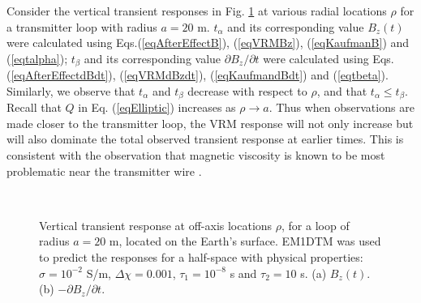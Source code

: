 \documentclass[onecolumn]{IEEEtran} %
\begin{document}
Consider the vertical transient responses in Fig. \ref{figEMandVRMrespOffAxis} at various radial locations $\rho$ for a transmitter loop with radius $a=20$ m. $t_{\alpha}$ and its corresponding value $B_z(t)$ were calculated using Eqs.(\ref{eqAfterEffectB}), (\ref{eqVRMBz}), (\ref{eqKaufmanB}) and (\ref{eqtalpha}); $t_{\beta}$ and its corresponding value $\partial B_z/\partial t$ were calculated using Eqs. (\ref{eqAfterEffectdBdt}), (\ref{eqVRMdBzdt}), (\ref{eqKaufmandBdt}) and (\ref{eqtbeta}). Similarly, we observe that $t_\alpha$ and $t_\beta$ decrease with respect to $\rho$, and that $t_\alpha \leq t_\beta$. Recall that $Q$ in Eq. (\ref{eqElliptic}) increases as $\rho \rightarrow a$. Thus when observations are made closer to the transmitter loop, the VRM response will not only increase but will also dominate the total observed transient response at earlier times. This is consistent with the observation that magnetic viscosity is known to be most problematic near the transmitter wire \cite{Buselli1982,Lee1984,Barsukov2001}.

%
\begin{figure}[!t]
    \centering
    \\
    \vspace{-10pt}
    \caption{Vertical transient response at off-axis locations $\rho$, for a loop of radius $a=20$ m, located on the Earth's surface. EM1DTM was used to predict the responses for a half-space with physical properties: $\sigma=10^{-2}$ S/m, $\Delta \chi=0.001$, $\tau_1=10^{-8}$ s and $\tau_2=10$ s. (a) $B_z (t)$. (b) $-\partial B_z/\partial t$.}
    \label{figEMandVRMrespOffAxis}
\end{figure}
%
\end{document}
